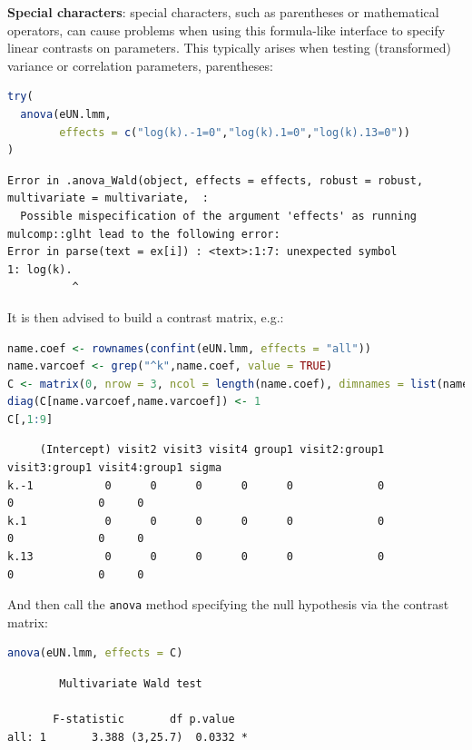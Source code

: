\documentclass[12pt]{article}
\begin{document}
\textbf{Special characters}: special characters, such as parentheses or
mathematical operators, can cause problems when using this
formula-like interface to specify linear contrasts on parameters. This
typically arises when testing (transformed) variance or correlation parameters,
parentheses:
\begin{lstlisting}[language=r,numbers=none]
try(
  anova(eUN.lmm,
        effects = c("log(k).-1=0","log(k).1=0","log(k).13=0"))
)
\end{lstlisting}

\label{}
\begin{verbatim}
Error in .anova_Wald(object, effects = effects, robust = robust, multivariate = multivariate,  : 
  Possible mispecification of the argument 'effects' as running mulcomp::glht lead to the following error: 
Error in parse(text = ex[i]) : <text>:1:7: unexpected symbol
1: log(k).
          ^
\end{verbatim}


It is then advised to build a contrast matrix, e.g.:
\begin{lstlisting}[language=r,numbers=none]
name.coef <- rownames(confint(eUN.lmm, effects = "all"))
name.varcoef <- grep("^k",name.coef, value = TRUE)
C <- matrix(0, nrow = 3, ncol = length(name.coef), dimnames = list(name.varcoef, name.coef))
diag(C[name.varcoef,name.varcoef]) <- 1
C[,1:9]
\end{lstlisting}

\label{}
\begin{verbatim}
     (Intercept) visit2 visit3 visit4 group1 visit2:group1 visit3:group1 visit4:group1 sigma
k.-1           0      0      0      0      0             0             0             0     0
k.1            0      0      0      0      0             0             0             0     0
k.13           0      0      0      0      0             0             0             0     0
\end{verbatim}


And then call the \texttt{anova} method specifying the null hypothesis via the
contrast matrix:
\begin{lstlisting}[language=r,numbers=none]
anova(eUN.lmm, effects = C)
\end{lstlisting}

\label{}
\begin{verbatim}
		Multivariate Wald test 

       F-statistic       df p.value  
all: 1       3.388 (3,25.7)  0.0332 *
\end{verbatim}
\end{document}
